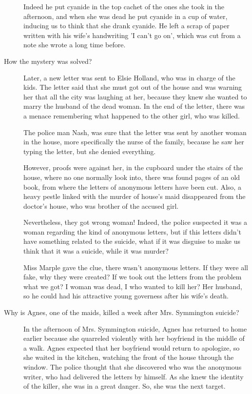 \documentclass[a4paper,12pt]{article}
\begin{document}
\begin{description}
{    Indeed  he put  cyanide  in the  top  cachet of  the ones  she  took in  the
    afternoon, and when she was dead he put cyanide in a cup of water, inducing
    us to think  that she drank cyanide.  He left a scrap of  paper written with
    his wife's handwriting 'I can't go on',  which was cut from a note she wrote
    a long time before.

  }

  
\item[How the mystery was solved?]
  {
    Later, a  new letter was  sent to  Elsie Holland, who  was in charge  of the
    kids. The letter said that she must got out of the house and was warning her
    that all  the city was  laughing at her,  because they knew she  wanted to
    marry the husband of  the dead woman. In the end of  the letter, there was a
    menace remembering what happened to the other girl, who was killed.
    
    The police man Nash,  was sure that the letter was sent by
    another  woman in the  house, more  specifically the  nurse of  the family,
    because he saw her typing the letter, but she denied everything.
    
    However, proofs were against her, in the cupboard under the stairs of the house, where no one
    normally look into, there was found pages
    of  an old  book, from  where  the letters  of anonymous  letters have  been
    cut. Also, a heavy pestle linked with the murder of house's maid disappeared
    from the doctor's house, who was brother of the accused girl.
    
    Nevertheless, they  got wrong woman! Indeed,  the police suspected  it was a
    woman regarding  the kind of anonymous  letters, but if  this letters didn't
    have something  related to the suicide, what  if it was disguise  to make us
    think that it was a suicide, while it was murder? 
    
    Miss Marple gave the clue, there  wasn't anonymous letters. If they were all
    fake, why  they were created?  If we took  out the letters from  the problem
    what we got? I woman was dead, I  who wanted to kill her? Her husband, so he
    could had his attractive young governess after his wife's death.
  }
  



\item[Why is Agnes, one of the maids, killed a week after Mrs. Symmington suicide?]
  {
    In the afternoon  of Mrs. Symmington suicide, Agnes has  returned  to home
    earlier because she quarreled violently with  her boyfriend in the middle of a
    walk.  Agnes expected that  her boyfriend  would return  to apologize,  so she
    waited in the kitchen, watching the front of the house through the window. 
    The police  thought that  she discovered who  was the anonymous  writer, who
    had  delivered the  letters by  himself.  As  she knew  the identity  of the
    killer, she was in a great danger. So, she was the next target.

}
\end{description}
\end{document}
